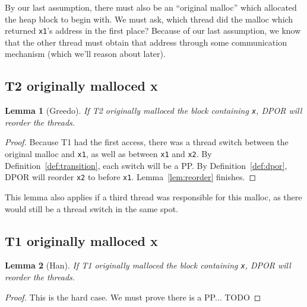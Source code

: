 \documentclass[pldi]{sigplanconf-pldi15}
\newtheorem{lemma}{Lemma}
\begin{document}
By our last assumption, there must also be an ``original malloc'' which allocated the heap block to begin with.
We must ask, which thread did the malloc which returned {\tt x1}'s address in the first place?
Because of our last assumption, we know that the other thread must obtain that address through some communication mechanism (which we'll reason about later).

\subsection{T2 originally malloced x}

\begin{lemma}[Greedo]
	If T2 originally malloced the block containing {\tt x}, DPOR will reorder the threads.
	\label{lem:greedo}
\end{lemma}
\begin{proof}
Because T1 had the first access, there was a thread switch between the original malloc and {\tt x1}, as well as between {\tt x1} and {\tt x2}. By Definition~\ref{def:transition}, each switch will be a PP.
By Definition~\ref{def:dpor}, DPOR will reorder {\tt x2} to before {\tt x1}. Lemma~\ref{lem:reorder} finishes.
\end{proof}

This lemma also applies if a third thread was responsible for this malloc, as there would still be a thread switch in the same spot.

\subsection{T1 originally malloced x}

\begin{lemma}[Han]
	If T1 originally malloced the block containing {\tt x}, DPOR will reorder the threads.
	\label{lem:han}
\end{lemma}

\begin{proof}
This is the hard case. We must prove there is a PP... TODO
\end{proof}


\end{document}
